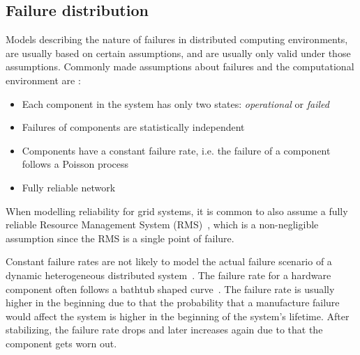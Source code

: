 \documentclass{cslthse-msc}
\begin{document}
\subsection{Failure distribution} \label{subsec:background_failure_distribution}
Models describing the nature of failures in distributed computing environments, are usually based on certain assumptions, and are usually only valid under those assumptions. Commonly made assumptions about failures and the computational environment are \cite{relModelDistSimSystem, relModelAnalysis, cloudServiceRel, studyServiceRel, hierarchicalRelModeling, selfAdaptRel}:
\begin{itemize}
	\item Each component in the system has only two states: \emph{operational} or \emph{failed}
	\item Failures of components are statistically independent
	\item Components have a constant failure rate, i.e. the failure of a component follows a Poisson process
	\item Fully reliable network
\end{itemize}

When modelling reliability for grid systems, it is common to also assume a fully reliable Resource Management System (RMS)~\cite{relAndPerfGridServices, relGridServicePredConstraint}, which is a non-negligible assumption since the RMS is a single point of failure.


Constant failure rates are not likely to model the actual failure scenario of a dynamic heterogeneous distributed system~\cite{algoMinExTime}. The failure rate for a hardware component often follows a bathtub shaped curve~\cite{surveyReliabilityDistr}. The failure rate is usually higher in the beginning due to that the probability that a manufacture failure would affect the system is higher in the beginning of the system's lifetime. After stabilizing, the failure rate drops and later increases again due to that the component gets worn out. %
\end{document}
